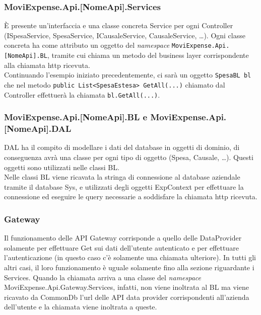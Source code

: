 \subsubsection{MoviExpense.Api.[NomeApi].Services}
\label{cap:services}

È presente un'interfaccia e una classe concreta Service per ogni Controller (ISpesaService, SpesaService, ICausaleService, CausaleService, \dots). Ogni classe concreta ha come attributo un oggetto del \emph{namespace} \verb+MoviExpense.Api.[NomeApi].BL+, tramite cui chiama un metodo del business layer corrispondente alla chiamata http ricevuta.\\
Continuando l'esempio iniziato precedentemente, ci sarà un oggetto \verb+SpesaBL bl+ che nel metodo \verb+public List<SpesaEstesa> GetAll(...)+ chiamato dal Controller effettuerà la chiamata \verb+bl.GetAll(...)+.

\subsubsection{MoviExpense.Api.[NomeApi].BL e MoviExpense.Api.[NomeApi].DAL}

DAL ha il compito di modellare i dati del database in oggetti di dominio, di conseguenza avrà una classe per ogni tipo di oggetto (Spesa, Causale, \dots). Questi oggetti sono utilizzati nelle classi BL.\\
Nelle classi BL viene ricavata la stringa di connessione al database aziendale tramite il database Sys, e utilizzati degli oggetti ExpContext per effettuare la connessione ed eseguire le query necessarie a soddisfare la chiamata http ricevuta.

\subsubsection{Gateway}

Il funzionamento delle \gls{API} Gateway corrisponde a quello delle DataProvider solamente per effettuare Get sui dati dell'utente autenticato e per effettuare l'autenticazione (in questo caso c'è solamente una chiamata ulteriore). In tutti gli altri casi, il loro funzionamento è uguale solamente fino alla sezione riguardante i Services. Quando la chiamata arriva a una classe del \emph{namespace} MoviExpense.Api.Gateway.Services, infatti, non viene inoltrata al BL ma viene ricavato da CommonDb l'url delle \gls{API} data provider corrispondenti all'azienda dell'utente e la chiamata viene inoltrata a queste.

